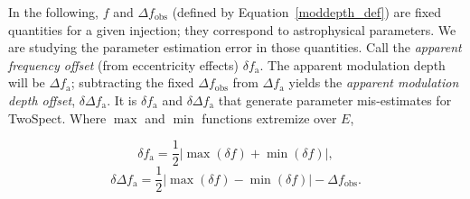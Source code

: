 \documentclass{article}
\begin{document}
In the following, $f$ and $\Delta f_\mathrm{obs}$ (defined by Equation~\ref{moddepth_def}) are fixed quantities for a given injection; they correspond to astrophysical parameters.
We are studying the parameter estimation error in those quantities.
Call the \textit{apparent frequency offset} (from eccentricity effects) $\delta f_\mathrm{a}$.
The apparent modulation depth will be $\Delta f_\mathrm{a}$; subtracting the fixed $\Delta f_\mathrm{obs}$ from $\Delta f_\mathrm{a}$ yields the \textit{apparent modulation depth offset}, $\delta \Delta f_\mathrm{a}$.
It is $\delta f_\mathrm{a}$ and $\delta \Delta f_\mathrm{a}$ that generate parameter mis-estimates for TwoSpect.
Where $\max$ and $\min$ functions extremize over $E$,

\begin{equation}
\delta f_\mathrm{a} = \frac{1}{2} \left| \max(\delta f) + \min(\delta f)\right|,
\label{dfa}
\end{equation}
\begin{equation}
\delta \Delta f_\mathrm{a} = \frac{1}{2} \left| \max(\delta f) - \min(\delta f)\right| - \Delta f_\mathrm{obs}.
\label{ddfa}
\end{equation}
\end{document}
